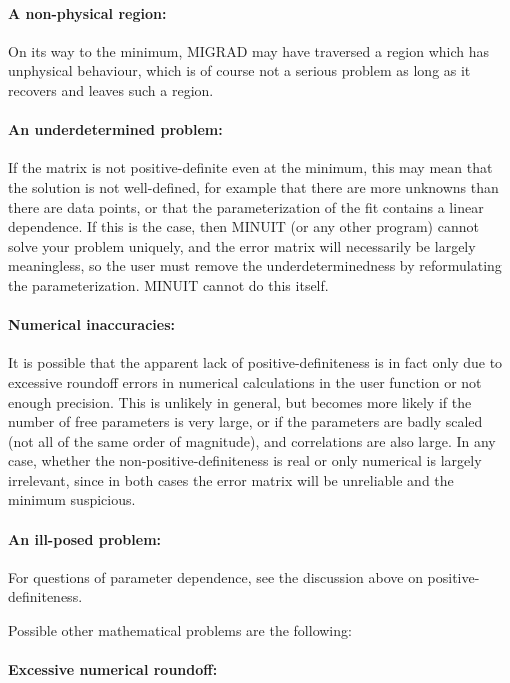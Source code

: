 \paragraph{A non-physical region:}

On its way to the minimum, MIGRAD may have traversed a region which has
unphysical behaviour, which is of course not a serious problem as long
as it recovers and leaves such a region.

\paragraph{An underdetermined problem:}

If the matrix is not positive-definite even at the minimum,
this may mean that the solution is not well-defined, for example
that there are more unknowns than there are data points, or that the
parameterization of the fit contains a linear dependence.
If this is the case, then MINUIT (or any other program) cannot solve
your problem uniquely, and the error matrix will necessarily be
largely meaningless, so the user must remove the underdeterminedness
by reformulating the parameterization. 
MINUIT cannot do this itself.

\paragraph{Numerical inaccuracies:}

It is possible that the apparent lack of positive-definiteness
is in fact only due to excessive roundoff errors in numerical
calculations in the user function or not enough precision.
This is unlikely in general, but becomes more likely if the number of
free parameters is very large, or if the parameters are badly scaled
(not all of the same order of magnitude), and correlations are
also large.
In any case, whether the non-positive-definiteness is
real or only numerical is largely irrelevant, since in both cases the
error matrix will be unreliable and the minimum suspicious.

\paragraph{An ill-posed problem:}

For questions of parameter dependence, see the discussion above
on positive-definiteness.

Possible other mathematical problems are the following:

\paragraph{Excessive numerical roundoff:}

